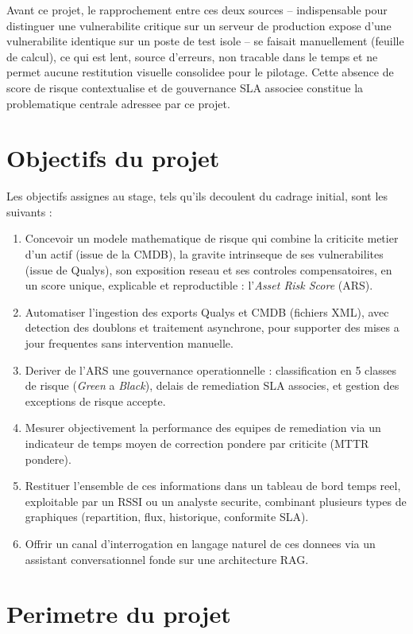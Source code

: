 Avant ce projet, le rapprochement entre ces deux sources -- indispensable pour
distinguer une vulnerabilite critique sur un serveur de production expose d'une
vulnerabilite identique sur un poste de test isole -- se faisait manuellement (feuille
de calcul), ce qui est lent, source d'erreurs, non tracable dans le temps et ne
permet aucune restitution visuelle consolidee pour le pilotage. Cette absence de
score de risque contextualise et de gouvernance SLA associee constitue la
problematique centrale adressee par ce projet.

\section{Objectifs du projet}

Les objectifs assignes au stage, tels qu'ils decoulent du cadrage initial, sont les
suivants :

\begin{enumerate}
  \item Concevoir un modele mathematique de risque qui combine la criticite metier
  d'un actif (issue de la CMDB), la gravite intrinseque de ses vulnerabilites (issue
  de Qualys), son exposition reseau et ses controles compensatoires, en un score
  unique, explicable et reproductible : l'\emph{Asset Risk Score} (ARS).
  \item Automatiser l'ingestion des exports Qualys et CMDB (fichiers XML), avec
  detection des doublons et traitement asynchrone, pour supporter des mises a jour
  frequentes sans intervention manuelle.
  \item Deriver de l'ARS une gouvernance operationnelle : classification en 5 classes
  de risque (\emph{Green} a \emph{Black}), delais de remediation SLA associes, et
  gestion des exceptions de risque accepte.
  \item Mesurer objectivement la performance des equipes de remediation via un
  indicateur de temps moyen de correction pondere par criticite (MTTR pondere).
  \item Restituer l'ensemble de ces informations dans un tableau de bord temps reel,
  exploitable par un RSSI ou un analyste securite, combinant plusieurs types de
  graphiques (repartition, flux, historique, conformite SLA).
  \item Offrir un canal d'interrogation en langage naturel de ces donnees via un
  assistant conversationnel fonde sur une architecture RAG.
\end{enumerate}

\section{Perimetre du projet}
\label{sec:perimetre}

